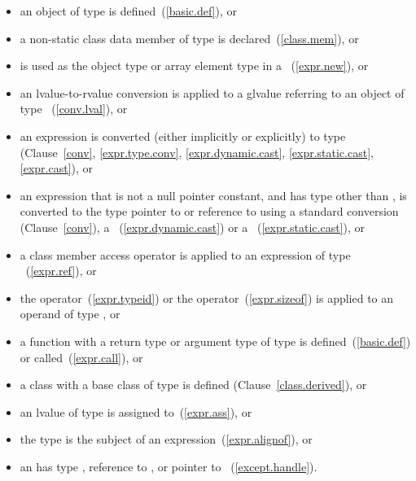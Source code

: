 \begin{itemize}
\item an object of type  is defined~(\ref{basic.def}), or
\item a non-static class data member of type  is
declared~(\ref{class.mem}), or
\item {} is used as the object type or array element type in a
~(\ref{expr.new}), or
\item an lvalue-to-rvalue conversion is applied to
a glvalue referring
to an object of type ~(\ref{conv.lval}), or
\item an expression is converted (either implicitly or explicitly) to
type  (Clause~\ref{conv}, \ref{expr.type.conv},
\ref{expr.dynamic.cast}, \ref{expr.static.cast}, \ref{expr.cast}), or
\item an expression that is not a null pointer constant, and has type
other than  , is converted to the type pointer to 
or reference to  using a standard conversion
(Clause~\ref{conv}), a ~(\ref{expr.dynamic.cast}) or
a ~(\ref{expr.static.cast}), or
\item a class member access operator is applied to an expression of type
~(\ref{expr.ref}), or
\item the  operator~(\ref{expr.typeid}) or the
 operator~(\ref{expr.sizeof}) is applied to an operand of
type , or
\item a function with a return type or argument type of type 
is defined~(\ref{basic.def}) or called~(\ref{expr.call}), or
\item a class with a base class of type  is
defined (Clause~\ref{class.derived}), or
\item an lvalue of type  is assigned to~(\ref{expr.ass}), or
\item the type  is the subject of an
 expression~(\ref{expr.alignof}), or
\item an  has type , reference to
, or pointer to ~(\ref{except.handle}).
\end{itemize}
\exitnote 

